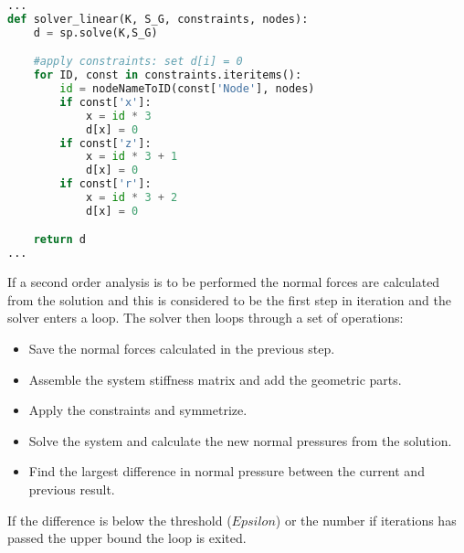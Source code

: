 \begin{inconsolata}
\begin{minipage}{\linewidth}
\begin{lstlisting}[language=python]
...
def solver_linear(K, S_G, constraints, nodes):
    d = sp.solve(K,S_G)

    #apply constraints: set d[i] = 0
    for ID, const in constraints.iteritems():
        id = nodeNameToID(const['Node'], nodes)
        if const['x']:
            x = id * 3
            d[x] = 0
        if const['z']:
            x = id * 3 + 1
            d[x] = 0
        if const['r']:
            x = id * 3 + 2
            d[x] = 0

    return d
...
\end{lstlisting}
\end{minipage}
\end{inconsolata}

If a second order analysis is to be performed the normal forces are calculated from the solution and this is considered to be the first step in iteration and the solver enters a loop.
The solver then loops through a set of operations:

\begin{itemize}
\item Save the normal forces calculated in the previous step.
\item Assemble the system stiffness matrix and add the geometric parts.
\item Apply the constraints and symmetrize.
\item Solve the system and calculate the new normal pressures from the solution.
\item Find the largest difference in normal pressure between the current and previous result.
\end{itemize}

If the difference is below the threshold ($Epsilon$) or the number if iterations has passed the upper bound the loop is exited.

